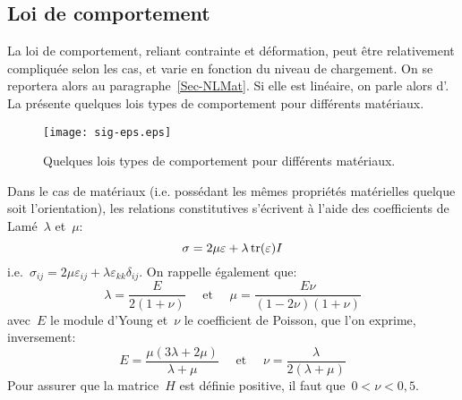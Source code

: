 \medskip
\subsection{Loi de comportement}\label{Sec-Loi}
La loi de comportement, reliant contrainte et déformation, peut être relativement compliquée selon les cas, et varie en fonction du niveau de chargement. On se reportera alors au paragraphe~\ref{Sec-NLMat}. Si elle est linéaire, on parle alors d'.
La  présente quelques lois types de comportement pour différents matériaux.
\begin{figure}[ht]
  \centerline{\texttt{[image: sig-eps.eps]}}
  \caption{\label{Fig-sig-eps} Quelques lois types de comportement pour différents matériaux.}
\end{figure}

\medskip
Dans le cas de matériaux  (i.e. possédant les mêmes propriétés matérielles quelque soit l'orientation), les relations constitutives s'écrivent à l'aide des coefficients de Lamé~$\lambda$ et~$\mu$:
\begin{equation}\sigma = 2\mu\varepsilon+\lambda \operatorname{tr}(\varepsilon)I\end{equation}
i.e.~$\sigma_{ij}=2\mu\varepsilon_{ij}+\lambda\varepsilon_{kk}\delta_{ij}$.
On rappelle également que:
\begin{equation}\lambda=\dfrac{E}{2(1+\nu)} \quad \text{ et } \quad \mu=\dfrac{E\nu}{(1-2\nu)(1+\nu)}
\end{equation}
avec~$E$ le module d'Young et~$\nu$ le coefficient de Poisson, que l'on exprime, inversement:
\begin{equation}
E=\dfrac{\mu(3\lambda+2\mu)}{\lambda+\mu} \quad\text{ et }\quad
\nu=\dfrac{\lambda}{2(\lambda+\mu)}
\end{equation}
Pour assurer que la matrice~$H$ est définie positive, il faut que~$0<\nu<0,5$.

